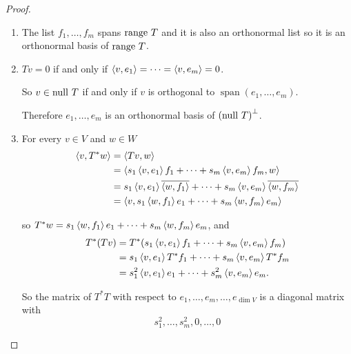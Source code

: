 \begin{proof}
    \begin{enumerate}[label={(\alph*)}]
        \item The list $f_{1}, \ldots, f_{m}$ spans $\operatorname{range}\,{T}$ and it is also an orthonormal list so it is an orthonormal basis of $\operatorname{range}\,{T}$.
        \item $Tv = 0$ if and only if $\left\langle{v, e_{1}}\right\rangle = \cdots = \left\langle{v, e_{m}}\right\rangle = 0$.

              So $v\in\operatorname{null}\,{T}$ if and only if $v$ is orthogonal to $\operatorname{span}(e_{1}, \ldots, e_{m})$.

              Therefore $e_{1}, \ldots, e_{m}$ is an orthonormal basis of ${(\operatorname{null}\,{T})}^{\bot}$.
        \item For every $v\in V$ and $w\in W$
              \begin{align*}
                  \left\langle{v, T^{*}w}\right\rangle & = \left\langle{Tv, w}\right\rangle                                                                                                  \\
                                        & = \left\langle{s_{1}\left\langle{v, e_{1}}\right\rangle f_{1} + \cdots + s_{m}\left\langle{v, e_{m}}\right\rangle f_{m}, w}\right\rangle                            \\
                                        & = s_{1}\left\langle{v,e_{1}}\right\rangle\overline{\left\langle{w, f_{1}}\right\rangle} + \cdots + s_{m}\left\langle{v,e_{m}}\right\rangle\overline{\left\langle{w, f_{m}}\right\rangle} \\
                                        & = \left\langle{v, s_{1}\left\langle{w, f_{1}}\right\rangle e_{1} + \cdots + s_{m}\left\langle{w, f_{m}}\right\rangle e_{m}}\right\rangle
              \end{align*}

              so $T^{*}w = s_{1}\left\langle{w, f_{1}}\right\rangle e_{1} + \cdots + s_{m}\left\langle{w, f_{m}}\right\rangle e_{m}$, and
              \begin{align*}
                  T^{*}(Tv) & = T^{*}(s_{1}\left\langle{v,e_{1}}\right\rangle f_{1} + \cdots + s_{m}\left\langle{v,e_{m}}\right\rangle f_{m})    \\
                            & = s_{1}\left\langle{v,e_{1}}\right\rangle T^{*}f_{1} + \cdots + s_{m}\left\langle{v,e_{m}}\right\rangle T^{*}f_{m} \\
                            & = s_{1}^{2}\left\langle{v,e_{1}}\right\rangle e_{1} + \cdots + s_{m}^{2}\left\langle{v,e_{m}}\right\rangle e_{m}.
              \end{align*}

              So the matrix of $T^{*}T$ with respect to $e_{1}, \ldots, e_{m}, \ldots, e_{\dim V}$ is a diagonal matrix with
              \[
                  s_{1}^{2}, \ldots, s_{m}^{2}, 0, \ldots, 0
              \]


\end{enumerate}
\end{proof}
